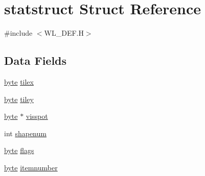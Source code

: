 \hypertarget{structstatstruct}{
\section{statstruct Struct Reference}
\label{structstatstruct}
}


{\ttfamily \#include $<$WL\_\-DEF.H$>$}

\subsection*{Data Fields}
\begin{DoxyCompactItemize}
\item 
\hyperlink{ID__HEAD_8H_a0c8186d9b9b7880309c27230bbb5e69d}{byte} \hyperlink{structstatstruct_a506fcf983f04e3169ec29fdcb0b5ff22}{tilex}
\item 
\hyperlink{ID__HEAD_8H_a0c8186d9b9b7880309c27230bbb5e69d}{byte} \hyperlink{structstatstruct_a0a6ae69d06cffdb4de2c8489c16a5fbc}{tiley}
\item 
\hyperlink{ID__HEAD_8H_a0c8186d9b9b7880309c27230bbb5e69d}{byte} $\ast$ \hyperlink{structstatstruct_a8b26aa7b11d0feb8c396a23f5ece7457}{visspot}
\item 
int \hyperlink{structstatstruct_a0ec8572937d3f1b28860d99776b82753}{shapenum}
\item 
\hyperlink{ID__HEAD_8H_a0c8186d9b9b7880309c27230bbb5e69d}{byte} \hyperlink{structstatstruct_ac118449094c044bae15c0664e6bf909b}{flags}
\item 
\hyperlink{ID__HEAD_8H_a0c8186d9b9b7880309c27230bbb5e69d}{byte} \hyperlink{structstatstruct_a0e599c7ceb980b5b8c0216c301a544c5}{itemnumber}
\end{DoxyCompactItemize}


